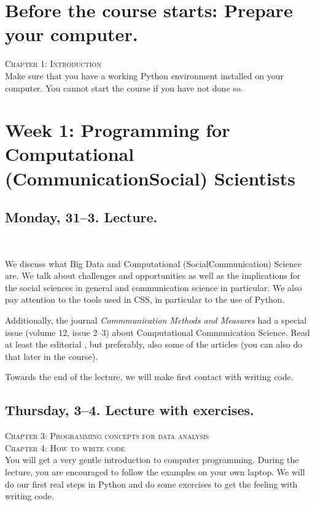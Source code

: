
\section*{Before the course starts: Prepare your computer.}

\textsc{ Chapter 1: Introduction}\\
Make sure that you have a working Python environment installed on your computer. You cannot start the course if you have not done so.

\section*{Week 1: Programming for Computational (Communication\textbar Social) Scientists}
\subsection*{Monday, 31--3. Lecture.}

\textsc{  \cite{Kitchin2014}} \\
\textsc{ \cite{Hilbert2019}}

We discuss what Big Data and Computational (Social\textbar Communication) Science are. We talk about challenges and opportunities as well as the implications for the social sciences in general and communication science in particular. We also pay attention to the tools used in CSS, in particular to the use of Python.

Additionally, the journal \textit{Commmunication Methods and Measures} had a special issue (volume 12, issue 2--3) about Computational Communication Science. Read at least the editorial \citep{VanAtteveldt2018a}, but preferably, also some of the articles (you can also do that later in the course).

Towards the end of the lecture, we will make first contact with writing code.

\subsection*{Thursday, 3--4. Lecture with exercises.}
\textsc{ Chapter 3: Programming concepts for data analysis}\\
\textsc{ Chapter 4: How to write code}\\

You will get a very gentle introduction to computer programming. During the lecture, you are encouraged to follow the examples on your own laptop.
We will do our first real steps in Python and do some exercises to get the feeling with writing code.


